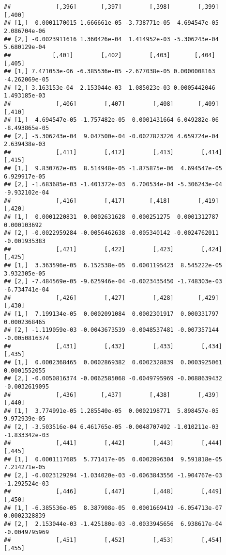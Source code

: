\documentclass[
]{article}
\begin{document}
\begin{verbatim}
##             [,396]       [,397]        [,398]        [,399]       [,400]
## [1,]  0.0001170015 1.666661e-05 -3.738771e-05  4.694547e-05 2.086704e-06
## [2,] -0.0023911616 1.360426e-04  1.414952e-03 -5.306243e-04 5.680129e-04
##            [,401]        [,402]        [,403]       [,404]        [,405]
## [1,] 7.471053e-06 -6.385536e-05 -2.677038e-05 0.0000008163 -4.262069e-05
## [2,] 3.163153e-04  2.153044e-03  1.085023e-03 0.0005442046  1.493185e-03
##             [,406]        [,407]        [,408]       [,409]        [,410]
## [1,]  4.694547e-05 -1.757482e-05  0.0001431664 6.049282e-06 -8.493865e-05
## [2,] -5.306243e-04  9.047500e-04 -0.0027823226 4.659724e-04  2.639438e-03
##             [,411]        [,412]        [,413]        [,414]        [,415]
## [1,]  9.830762e-05  8.514948e-05 -1.875875e-06  4.694547e-05  6.929917e-05
## [2,] -1.683685e-03 -1.401372e-03  6.700534e-04 -5.306243e-04 -9.932102e-04
##             [,416]        [,417]       [,418]        [,419]       [,420]
## [1,]  0.0001220831  0.0002631628  0.000251275  0.0001312787  0.000103692
## [2,] -0.0022959284 -0.0056462638 -0.005340142 -0.0024762011 -0.001935383
##             [,421]        [,422]        [,423]        [,424]        [,425]
## [1,]  3.363596e-05  6.152538e-05  0.0001195423  8.545222e-05  3.932305e-05
## [2,] -7.484569e-05 -9.625946e-04 -0.0023435450 -1.748303e-03 -6.734741e-04
##             [,426]        [,427]        [,428]       [,429]        [,430]
## [1,]  7.199134e-05  0.0002091084  0.0002301917  0.000331797  0.0002368465
## [2,] -1.119059e-03 -0.0043673539 -0.0048537481 -0.007357144 -0.0050816374
##             [,431]        [,432]        [,433]        [,434]        [,435]
## [1,]  0.0002368465  0.0002869382  0.0002328839  0.0003925061  0.0001552055
## [2,] -0.0050816374 -0.0062585068 -0.0049795969 -0.0088639432 -0.0032619095
##             [,436]       [,437]        [,438]        [,439]        [,440]
## [1,]  3.774991e-05 1.285540e-05  0.0002198771  5.898457e-05  9.972939e-05
## [2,] -3.503516e-04 6.461765e-05 -0.0048707492 -1.010211e-03 -1.833342e-03
##             [,441]        [,442]        [,443]        [,444]        [,445]
## [1,]  0.0001117685  5.771417e-05  0.0002896304  9.591818e-05  7.214271e-05
## [2,] -0.0023129294 -1.034020e-03 -0.0063843556 -1.904767e-03 -1.292524e-03
##             [,446]        [,447]        [,448]        [,449]        [,450]
## [1,] -6.385536e-05  8.387908e-05  0.0001669419 -6.054713e-07  0.0002328839
## [2,]  2.153044e-03 -1.425180e-03 -0.0033945656  6.938617e-04 -0.0049795969
##             [,451]        [,452]        [,453]        [,454]       [,455]

\end{verbatim}
\end{document}
